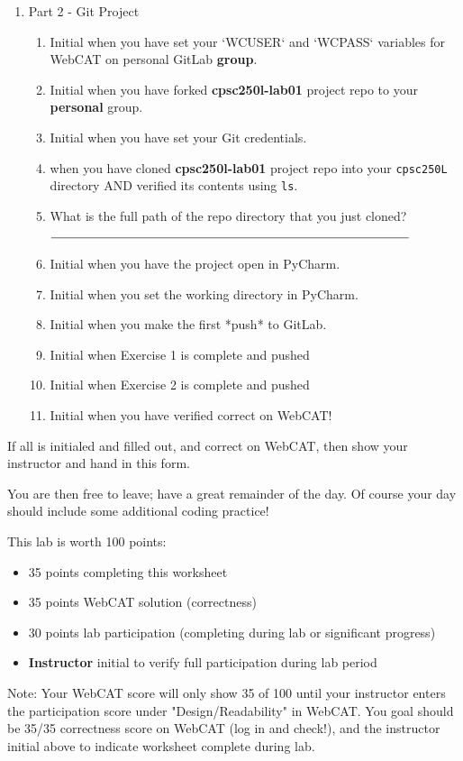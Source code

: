 \documentclass[notitlepage,12pt]{../../cpsc250l}
\begin{document}
\begin{enumerate}
\begin{enumerate}
	\item What is the shortcut that enables us to avoid typing out the full ``cd Desktop'' (or any other file or directory name) every time?\\
	$\rule{6cm}{0.15mm}$
	\end{enumerate}
\vspace{0.5cm}
\item Part 2 - Git Project
	\begin{enumerate}
	\item \initial Initial when you have set your `WCUSER` and `WCPASS` variables for WebCAT on personal GitLab \textbf{group}.
	\item \initial Initial when you have forked \textbf{cpsc250l-lab01} project repo to your \textbf{personal} group.
	\item \initial Initial when you have set your Git credentials.
	\item \initial when you have cloned \textbf{cpsc250l-lab01} project repo into your \texttt{cpsc250L} directory AND verified its contents using \texttt{ls}.
	\item What is the full path of the repo directory that you just cloned?\\ $\rule{10cm}{0.15mm}$
	\item \initial Initial when you have the project open in PyCharm.
	\item \initial Initial when you set the working directory in PyCharm.
	\item \initial Initial when you make the first *push* to GitLab.
	\item \initial Initial when Exercise 1 is complete and pushed
	\item \initial Initial when Exercise 2 is complete and pushed
	\item \initial Initial when you have verified correct on WebCAT!

	\end{enumerate}
\end{enumerate}

If all is initialed and filled out, and correct on WebCAT, then
show your instructor and hand in this form.

You are then free to leave; have a great remainder of the day.
Of course your day should include some additional coding practice!

This lab is worth 100 points:
\begin{itemize}
 \item 35 points completing this worksheet
 \item 35 points WebCAT solution (correctness)
 \item 30 points lab participation (completing during lab or significant progress)
 \item \initial \textbf{Instructor} initial to verify full participation during lab period
\end{itemize}

 Note: Your WebCAT score will only show 35 of 100 until your
 instructor enters the participation score under "Design/Readability" in WebCAT.
 You goal should be 35/35 correctness score on WebCAT (log in and check!),
 and the instructor initial above to indicate worksheet complete during lab.
\end{document}
